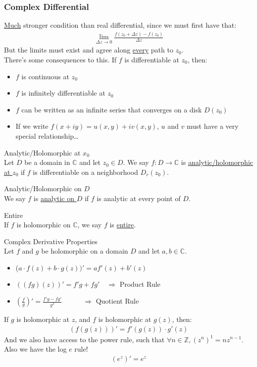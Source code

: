 \documentclass[10pt]{paper}
\newcommand{\Z}{\mathbb{Z}}\newcommand{\R}{\mathbb{R}}\newcommand{\N}{\mathbb{N}}\newcommand{\Q}{\mathbb{Q}}\newcommand{\C}{\mathbb{C}}
\newcommand{\gspc}{\vspace{0.13cm}} %
\newcommand{\gline}[0]{\gspc\\} %
\newcommand{\cpr}[1]{\left(#1\right)}
\newcommand{\ul}[1]{\underline{#1}}
\begin{document}
\subsubsection{Complex Differential}
\ul{Much} stronger condition than real differential, since we must first have that:
\begin{align*}
  \lim_{\Delta z \to 0}\frac{f(z_0+\Delta z) - f(z_0)}{\Delta z}
\end{align*}
But the limits must exist and agree along \ul{every} path to $z_0$. \gline{}
There's some consequences to this. If $f$ is differentiable at $z_0$, then:
\begin{itemize}[parsep=0pt, itemsep=0pt]
  \item $f$ is continuous at $z_0$
  \item $f$ is infinitely differentiable at $z_0$
  \item $f$ can be written as an infinite series that converges on a disk $D(z_0)$
  \item If we write $f(x+iy) = u(x,y)+ iv(x,y)$, $u$ and $v$ must have a very special relationship\ldots
\end{itemize}
\begin{definition}{Analytic/Holomorphic at $x_0$}{}\gline{}
  Let $D$ be a domain in $\C$ and let $z_0\in D$. We say $f:D\to\C$ is \ul{analytic/holomorphic at $z_0$} if $f$ is differentiable on a neighborhood $D_r(z_0)$. 
  \begin{definition}{Analytic/Holomorphic on $D$}{}\gline{}
    We say $f$ is \ul{analytic on $D$} if $f$ is analytic at every point of $D$.
  \end{definition}
  \begin{definition}{Entire}{}\gline{}
    If $f$ is holomorphic on $\C$, we say $f$ is \ul{entire}.
  \end{definition}
\end{definition}
\begin{theorem}{Complex Derivative Properties}{}\gline{}
  Let $f$ and $g$ be holomorphic on a domain $D$ and let $a,b\in\C$. 
  \begin{itemize}
    \item ($a\cdot f(z) + b\cdot g(z))'=af'(z) + b'(z) $
    \item $\cpr{(fg)(z)}' = f'g + f g'\quad\Rightarrow$ Product Rule
    \item $\cpr{\frac{f}g}'=\frac{f'g-fg'}{g^2}\quad\quad\quad\Rightarrow$ Quotient Rule
  \end{itemize}
  If $g$ is holomorphic at $z$, and $f$ is holomorphic at $g(z)$, then:
  \begin{align*}
    (f(g(z)))' = f'(g(z))\cdot g'(z)
  \end{align*}
  And we also have access to the power rule, such that $\forall n\in \Z, \cpr{z^n}^1=nz^{n-1}$. Also we have the log $e$ rule!
  \begin{align*}
    \cpr{e^z}'=e^z
  \end{align*}
\end{theorem}
\end{document}

